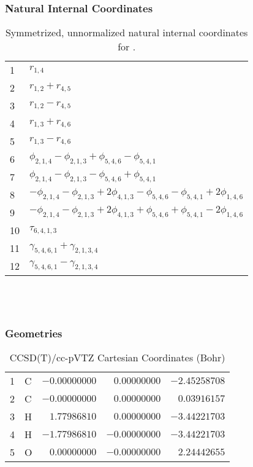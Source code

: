 \documentclass[10pt,oneside]{article}
\begin{document}
\subsubsection*{Natural Internal Coordinates}
\begin{table}[h!]
\centering
\caption{Symmetrized, unnormalized natural internal coordinates for .}
\small
\begin{tabular}{ll}
  1   & $r_{1,4}$ \\
  2   & $r_{1,2} + r_{4,5}$ \\
  3   & $r_{1,2} - r_{4,5}$ \\
  4   & $r_{1,3} + r_{4,6}$ \\
  5   & $r_{1,3} - r_{4,6}$ \\
  6   & $\phi_{2,1,4} - \phi_{2,1,3} + \phi_{5,4,6} - \phi_{5,4,1}$ \\
  7   & $\phi_{2,1,4} - \phi_{2,1,3} - \phi_{5,4,6} + \phi_{5,4,1}$ \\
  8   & $-\phi_{2,1,4} - \phi_{2,1,3} + 2\phi_{4,1,3} - \phi_{5,4,6} - \phi_{5,4,1} + 2\phi_{1,4,6}$ \\
  9   & $-\phi_{2,1,4} - \phi_{2,1,3} + 2\phi_{4,1,3} + \phi_{5,4,6} + \phi_{5,4,1} - 2\phi_{1,4,6}$ \\
  10  & $\tau_{6,4,1,3}$ \\
  11  & $\gamma_{5,4,6,1} + \gamma_{2,1,3,4}$ \\
  12  & $\gamma_{5,4,6,1} - \gamma_{2,1,3,4}$ \\
\end{tabular}
\end{table}

\clearpage

\subsection{\ \ \ }

\subsubsection*{Geometries}
\begin{table}[h!]
\centering
\caption{CCSD(T)/cc-pVTZ Cartesian Coordinates (Bohr)}
\begin{tabular}{llrrr}
1  & C  & $-0.00000000$ & $ 0.00000000$ & $-2.45258708$ \\
2  & C  & $-0.00000000$ & $ 0.00000000$ & $ 0.03916157$ \\
3  & H  & $ 1.77986810$ & $ 0.00000000$ & $-3.44221703$ \\
4  & H  & $-1.77986810$ & $-0.00000000$ & $-3.44221703$ \\
5  & O  & $ 0.00000000$ & $-0.00000000$ & $ 2.24442655$ \\
\end{tabular}
\end{table}
\end{document}
